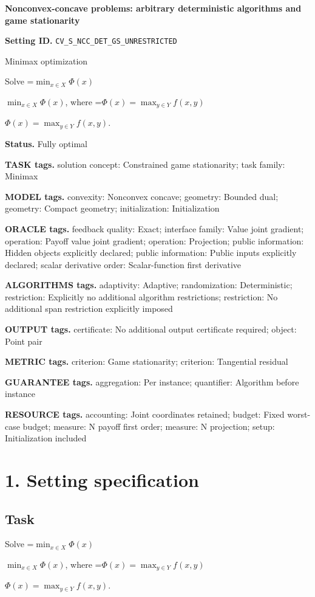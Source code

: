 \documentclass[10pt,a4paper]{article}
\newcommand{\AtlasMath}[1]{\par\begingroup\centering\setbox0=\hbox{$\displaystyle #1$}\ifdim\wd0>1.4\linewidth\typeout{ATLAS WIDE FORMULA: \the\wd0}\fi\ifdim\wd0>\linewidth\resizebox{\linewidth}{!}{\box0}\else\box0\fi\par\endgroup}
\newcommand{\AtlasInlineMath}[1]{\begingroup\setbox0=\hbox{$#1$}\ifdim\wd0>.4\linewidth\endgroup\AtlasMath{#1}\else\endgroup$#1$\fi}
\begin{document}
\raggedright

{\LARGE\bfseries\sffamily\color{AtlasNavy} Nonconvex-concave problems: arbitrary deterministic algorithms and game stationarity\par}\vspace{5pt}
\textbf{Setting ID.} \texttt{CV\_\allowbreak{}S\_\allowbreak{}NCC\_\allowbreak{}DET\_\allowbreak{}GS\_\allowbreak{}UNRESTRICTED}

Minimax optimization

Solve \AtlasInlineMath{\min_{x\in X}\Phi(x)}, where \AtlasInlineMath{\Phi(x)=\max_{y\in Y}f(x,y)}.

\textbf{Status.} Fully optimal

\textbf{TASK tags.} solution concept: Constrained game stationarity; task family: Minimax

\textbf{MODEL tags.} convexity: Nonconvex concave; geometry: Bounded dual; geometry: Compact geometry; initialization: Initialization

\textbf{ORACLE tags.} feedback quality: Exact; interface family: Value joint gradient; operation: Payoff value joint gradient; operation: Projection; public information: Hidden objects explicitly declared; public information: Public inputs explicitly declared; scalar derivative order: Scalar-function first derivative

\textbf{ALGORITHMS tags.} adaptivity: Adaptive; randomization: Deterministic; restriction: Explicitly no additional algorithm restrictions; restriction: No additional span restriction explicitly imposed

\textbf{OUTPUT tags.} certificate: No additional output certificate required; object: Point pair

\textbf{METRIC tags.} criterion: Game stationarity; criterion: Tangential residual

\textbf{GUARANTEE tags.} aggregation: Per instance; quantifier: Algorithm before instance

\textbf{RESOURCE tags.} accounting: Joint coordinates retained; budget: Fixed worst-case budget; measure: N payoff first order; measure: N projection; setup: Initialization included

\section{1. Setting specification}
\subsection{Task}
Solve \AtlasInlineMath{\min_{x\in X}\Phi(x)}, where \AtlasInlineMath{\Phi(x)=\max_{y\in Y}f(x,y)}.
\end{document}
